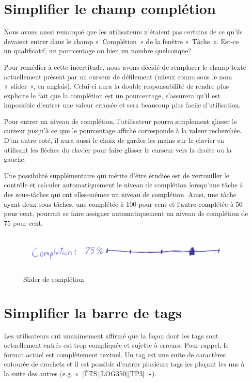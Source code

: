 \documentclass[letterpaper, oneside, 12pt, these, creativecommons]{thETS}
\begin{document}
\section{Simplifier le champ complétion}

Nous avons aussi remarqué que les utilisateurs n'étaient pas certains de ce qu'ils devaient entrer dans le champ « Complétion » de la fenêtre « Tâche ». Est-ce un qualificatif, un pourcentage ou bien un nombre quelconque?

Pour remédier à cette incertitude, nous avons décidé de remplacer le champ texte actuellement présent par un curseur de défilement (mieux connu sous le nom « slider », en anglais). Celui-ci aura la double responsabilité de rendre plus explicite le fait que la complétion est un pourcentage, s'assurera qu'il est impossible d'entrer une valeur erronée et sera beaucoup plus facile d'utilisation.

Pour entrer un niveau de complétion, l'utilisateur pourra simplement glisser le curseur jusqu'à ce que le pourcentage affiché corresponde à la valeur recherchée. D'un autre coté, il aura aussi le choix de garder les mains sur le clavier en utilisant les flèches du clavier pour faire glisser le curseur vers la droite ou la gauche.

Une possibilité supplémentaire qui mérite d'être étudiée est de verrouiller le contrôle et calculer automatiquement le niveau de complétion lorsqu'une tâche à des sous-tâches qui ont elles-mêmes un niveau de complétion. Ainsi, une tâche ayant deux sous-tâches, une complétée à 100 pour cent et l'autre complétée à 50 pour cent, pourrait se faire assigner automatiquement un niveau de complétion de 75 pour cent.

\begin{figure}
    \includegraphics[scale=0.25]{completion2.png}
    \caption{Slider de complétion}
\end{figure}

\section{Simplifier la barre de tags}

Les utilisateurs ont unanimement affirmé que la façon dont les tags sont actuellement entrés est trop compliquée et sujette à erreurs. Pour rappel, le format actuel est complètement textuel. Un tag est une suite de caractères entourée de crochets et il est possible d'entrer plusieurs tags les plaçant les uns à la suite des autres (e.g. « [ÉTS][LOG350][TP3] »).
\end{document}
